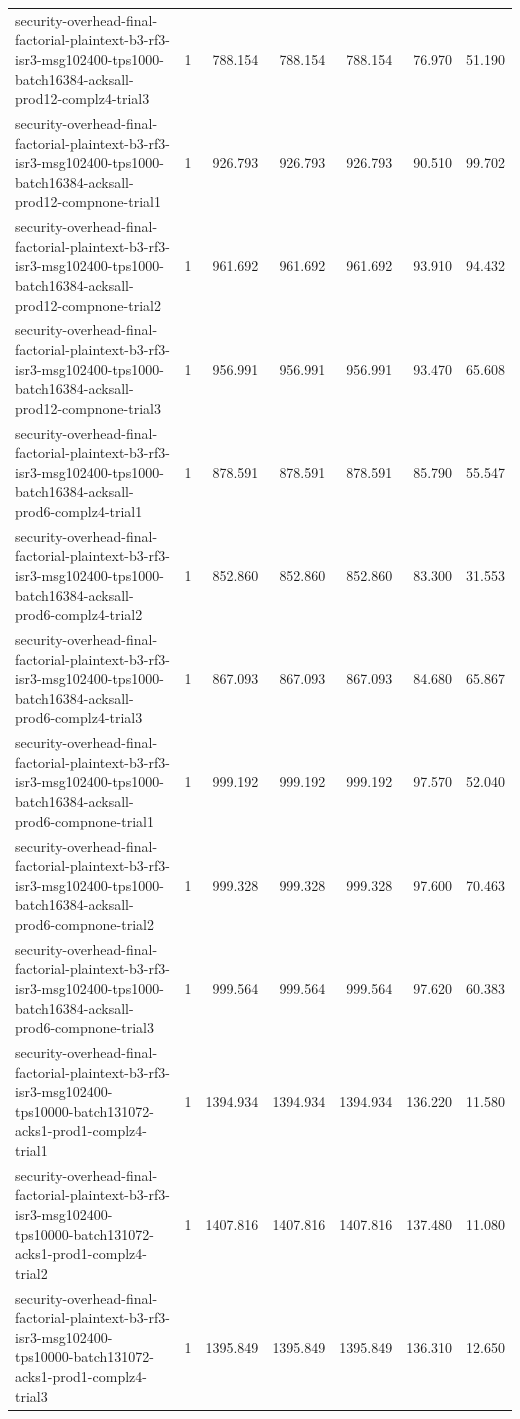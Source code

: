 \begin{tabular}{lrrrrrr}
security-overhead-final-factorial-plaintext-b3-rf3-isr3-msg102400-tps1000-batch16384-acksall-prod12-complz4-trial3 & 1 & 788.154 & 788.154 & 788.154 & 76.970 & 51.190 \\
security-overhead-final-factorial-plaintext-b3-rf3-isr3-msg102400-tps1000-batch16384-acksall-prod12-compnone-trial1 & 1 & 926.793 & 926.793 & 926.793 & 90.510 & 99.702 \\
security-overhead-final-factorial-plaintext-b3-rf3-isr3-msg102400-tps1000-batch16384-acksall-prod12-compnone-trial2 & 1 & 961.692 & 961.692 & 961.692 & 93.910 & 94.432 \\
security-overhead-final-factorial-plaintext-b3-rf3-isr3-msg102400-tps1000-batch16384-acksall-prod12-compnone-trial3 & 1 & 956.991 & 956.991 & 956.991 & 93.470 & 65.608 \\
security-overhead-final-factorial-plaintext-b3-rf3-isr3-msg102400-tps1000-batch16384-acksall-prod6-complz4-trial1 & 1 & 878.591 & 878.591 & 878.591 & 85.790 & 55.547 \\
security-overhead-final-factorial-plaintext-b3-rf3-isr3-msg102400-tps1000-batch16384-acksall-prod6-complz4-trial2 & 1 & 852.860 & 852.860 & 852.860 & 83.300 & 31.553 \\
security-overhead-final-factorial-plaintext-b3-rf3-isr3-msg102400-tps1000-batch16384-acksall-prod6-complz4-trial3 & 1 & 867.093 & 867.093 & 867.093 & 84.680 & 65.867 \\
security-overhead-final-factorial-plaintext-b3-rf3-isr3-msg102400-tps1000-batch16384-acksall-prod6-compnone-trial1 & 1 & 999.192 & 999.192 & 999.192 & 97.570 & 52.040 \\
security-overhead-final-factorial-plaintext-b3-rf3-isr3-msg102400-tps1000-batch16384-acksall-prod6-compnone-trial2 & 1 & 999.328 & 999.328 & 999.328 & 97.600 & 70.463 \\
security-overhead-final-factorial-plaintext-b3-rf3-isr3-msg102400-tps1000-batch16384-acksall-prod6-compnone-trial3 & 1 & 999.564 & 999.564 & 999.564 & 97.620 & 60.383 \\
security-overhead-final-factorial-plaintext-b3-rf3-isr3-msg102400-tps10000-batch131072-acks1-prod1-complz4-trial1 & 1 & 1394.934 & 1394.934 & 1394.934 & 136.220 & 11.580 \\
security-overhead-final-factorial-plaintext-b3-rf3-isr3-msg102400-tps10000-batch131072-acks1-prod1-complz4-trial2 & 1 & 1407.816 & 1407.816 & 1407.816 & 137.480 & 11.080 \\
security-overhead-final-factorial-plaintext-b3-rf3-isr3-msg102400-tps10000-batch131072-acks1-prod1-complz4-trial3 & 1 & 1395.849 & 1395.849 & 1395.849 & 136.310 & 12.650 \\

\end{tabular}
